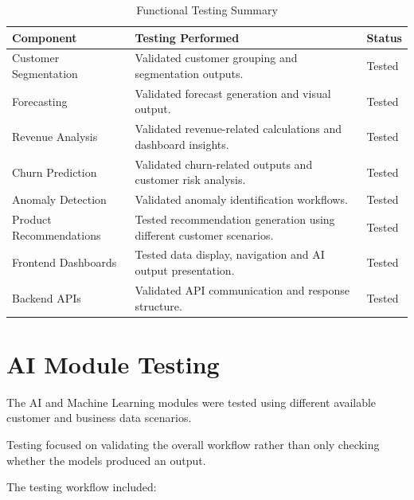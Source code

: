 \documentclass[12pt,a4paper]{report}
\begin{document}
\begin{table}[H]
\centering
\caption{Functional Testing Summary}
\begin{tabular}{p{4.5cm} p{6.5cm} p{2cm}}
\toprule
\textbf{Component} &
\textbf{Testing Performed} &
\textbf{Status} \\
\midrule

Customer Segmentation &
Validated customer grouping and segmentation outputs. &
Tested \\

Forecasting &
Validated forecast generation and visual output. &
Tested \\

Revenue Analysis &
Validated revenue-related calculations and dashboard insights. &
Tested \\

Churn Prediction &
Validated churn-related outputs and customer risk analysis. &
Tested \\

Anomaly Detection &
Validated anomaly identification workflows. &
Tested \\

Product Recommendations &
Tested recommendation generation using different customer scenarios. &
Tested \\

Frontend Dashboards &
Tested data display, navigation and AI output presentation. &
Tested \\

Backend APIs &
Validated API communication and response structure. &
Tested \\

\bottomrule
\end{tabular}
\end{table}



\section{AI Module Testing}

The AI and Machine Learning modules were tested using different
available customer and business data scenarios.

Testing focused on validating the overall workflow rather than only
checking whether the models produced an output.

The testing workflow included:
\end{document}
